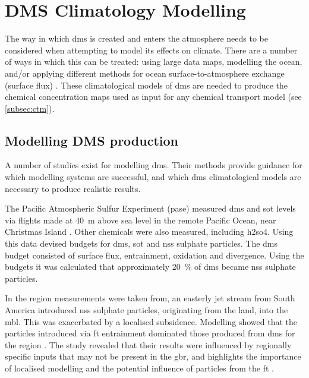 
\chapter{DMS Climatology Modelling}
\label{ch:dmsclim}

The way in which \gls{dms} is created and enters the atmosphere needs to be considered when attempting to model its effects on climate. There are a number of ways in which this can be treated: using large data maps, modelling the ocean, and/or applying different methods for ocean surface-to-atmosphere exchange (surface flux) \citep{woodhouse:2010ed}. These climatological models of \gls{dms} are needed to produce the chemical concentration maps used as input for any chemical transport model (see \cref{subsec:ctm}).

	\section{Modelling DMS production}
	\label{sec:modeldms}

	A number of studies exist for modelling \gls{dms}. Their methods provide guidance for which modelling systems are successful, and which \gls{dms} climatological models are necessary to produce realistic results.

	The Pacific Atmospheric Sulfur Experiment (\gls{pase}) measured \gls{dms} and \gls{sot} levels via flights made at \SI{40}{\metre} above sea level in the remote Pacific Ocean, near Christmas Island \citep{bandy2011pacific}. Other chemicals were also measured, including \gls{h2so4}. Using this data \citet{simpson:2014} devised budgets for \gls{dms}, \gls{sot} and \gls{nss} sulphate particles. The \gls{dms} budget consisted of surface flux, entrainment, oxidation and divergence. Using the budgets it was calculated that approximately \SI{20}{\percent} of \gls{dms} became \gls{nss} sulphate particles. 

	In the region measurements were taken from, an easterly jet stream from South America introduced \gls{nss} sulphate particles, originating from the land, into the \gls{mbl}. This was exacerbated by a localised subsidence. Modelling showed that the particles introduced via \gls{ft} entrainment dominated those produced from \gls{dms} for the region \citep{simpson:2014}. The study revealed that their results were influenced by regionally specific inputs that may not be present in the \gls{gbr}, and highlights the importance of localised modelling and the potential influence of particles from the \gls{ft} \citep{simpson:2014}.

